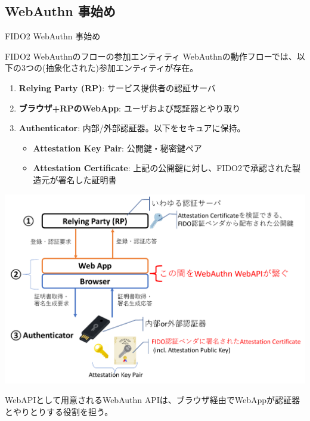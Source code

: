 \documentclass[12pt,dvipdfmx,uplatex]{beamer}
\begin{document}
\subsection{WebAuthn 事始め}

\begin{frame}
\centering
{\Large FIDO2 WebAuthn 事始め}
\end{frame}

\begin{frame}{FIDO2 WebAuthnのフローの参加エンティティ}
WebAuthnの動作フローでは、以下の3つの(抽象化された)参加エンティティが存在。
\begin{enumerate}
 \item \textbf{Relying Party (RP)}: サービス提供者の認証サーバ
 \item \textbf{ブラウザ+RPのWebApp}: ユーザおよび認証器とやり取り
 \item \textbf{Authenticator}: 内部/外部認証器。以下をセキュアに保持。
\begin{itemize}
\item \textbf{\alert{Attestation Key Pair}}: 公開鍵・秘密鍵ペア
\item \textbf{\alert{Attestation Certificate}}: 上記の公開鍵に対し、FIDO2で承認された製造元が署名した証明書
\end{itemize}
\end{enumerate}
\end{frame}
\begin{frame}
\begin{center}
\includegraphics[width=0.9\linewidth]{Figs/webauthn-entities.pdf}
\end{center}
WebAPIとして用意されるWebAuthn APIは、ブラウザ経由でWebAppが認証器とやりとりする役割を担う。
\end{frame}
\end{document}
